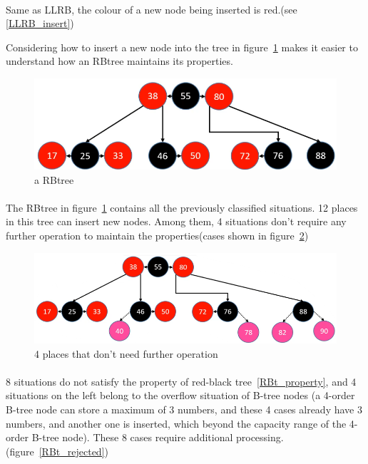 \documentclass{article}
\begin{document}
\paragraph{}
Same as LLRB, the colour of a new node being inserted is red.(see \ref{LLRB_insert})

Considering how to insert a new node into the tree in figure~\ref{RBt_example} makes it easier to understand how an RBtree maintains its properties.

\begin{figure}[htbp]
    \centering

    \includegraphics[height = 50 pt]{RBtree.png}
    \caption{a RBtree}
    \label{RBt_example}
\end{figure}

\paragraph{}
The RBtree in figure~\ref{RBt_example} contains all the previously classified situations. 12 places in this tree can insert new nodes. Among them, 4 situations don't require any further operation to maintain the properties(cases shown in figure~\ref{RBt_accepted})

\begin{figure}[htbp]
    \centering

    \includegraphics[height = 50 pt]{RBt_accepted.png}
    \caption{4 places that don't need further operation}
    \label{RBt_accepted}
\end{figure}

\paragraph{}
8 situations do not satisfy the property of red-black tree~\ref{RBt_property}, and 4 situations on the left belong to the overflow situation of B-tree nodes (a 4-order B-tree node can store a maximum of 3 numbers, and these 4 cases already have 3 numbers, and another one is inserted, which beyond the capacity range of the 4-order B-tree node). These 8 cases require additional processing. (figure~\ref{RBt_rejected})
\end{document}
